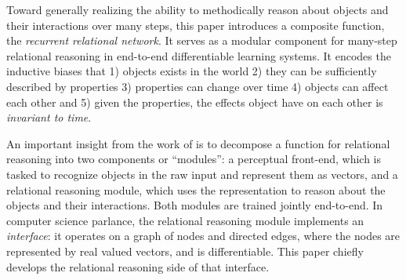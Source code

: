 \documentclass{article}
\newcommand{\rbp}[1]{

}
\begin{document}
Toward generally realizing the ability to methodically reason about objects and their interactions over many steps, this paper introduces a composite function, the \emph{recurrent relational network}. It serves as a modular component for many-step relational reasoning in end-to-end differentiable learning systems. It encodes the inductive biases that 1) objects exists in the world 2) they can be sufficiently described by properties 3) properties can change over time 4) objects can affect each other and 5) given the properties, the effects object have on each other is \emph{invariant to time}.


An important insight from the work of \citet{santoro2017simple} is to decompose a function
for relational reasoning into two components or ``modules'':
a perceptual front-end, which is tasked to recognize objects in the raw input and represent them as vectors,
and a relational reasoning module, which uses the representation to reason about the objects and their interactions.
Both modules are trained jointly end-to-end.
In computer science parlance, the relational reasoning module implements an \emph{interface}: it operates on a graph of nodes 
and directed edges, where the nodes are represented by real valued vectors, and is differentiable.
This paper chiefly develops the relational reasoning side of that interface.
\end{document}
